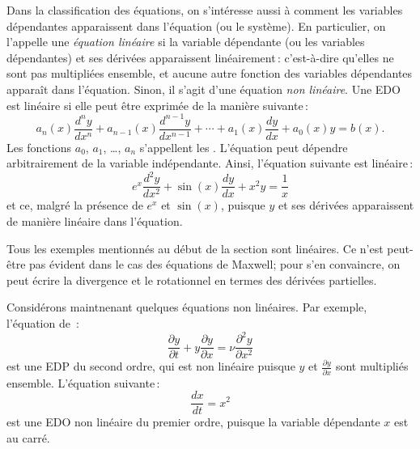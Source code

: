 \medskip

Dans la classification des \'equations, on s'int\'eresse aussi \`a comment les variables d\'ependantes apparaissent dans l'\'equation (ou le syst\`eme).  En particulier, on l'appelle une 
\emph{\'equation lin\'eaire} si la variable d\'ependante (ou les variables d\'ependantes) et ses d\'eriv\'ees apparaissent lin\'eairement\,:  c'est-\`a-dire qu'elles ne sont pas multipli\'ees ensemble, et aucune autre fonction des variables d\'ependantes appara\^it dans l'\'equation.  Sinon, il s'agit d'une \'equation 
\emph{non lin\'eaire}.  Une EDO est lin\'eaire si elle peut \^etre exprim\'ee de la mani\`ere suivante\,: 
\begin{equation} \label{classification:eqlingen}
a_n(x) \frac{d^n y}{dx^n} + 
a_{n-1}(x) \frac{d^{n-1} y}{dx^{n-1}} + 
\cdots
+
a_{1}(x) \frac{dy}{dx}
+
a_{0}(x) y = b(x) .
\end{equation}
Les fonctions $a_0$, $a_1$, \ldots, $a_n$ s'appellent les
\emph{}.
L'\'equation peut d\'ependre arbitrairement de la variable ind\'ependante.  Ainsi, l'\'equation suivante est lin\'eaire\,:
\begin{equation} \label{classification:eqlinex}
e^x \frac{d^2 y}{dx^2} + 
\sin(x) \frac{d y}{dx} + 
x^2 y
=
\frac{1}{x}
\end{equation}
et ce, malgr\'e la pr\'esence de $e^x$ et $\sin(x)$, puisque $y$ et ses d\'eriv\'ees apparaissent de mani\`ere lin\'eaire dans l'\'equation.

Tous les exemples mentionnés au début de la section sont lin\'eaires.  Ce n'est peut-\^etre pas \'evident dans le cas des \'equations de Maxwell; pour s'en convaincre, on peut \'ecrire la divergence et le rotationnel en termes des d\'eriv\'ees partielles. 

Consid\'erons maintnenant quelques \'equations non lin\'eaires.  Par exemple, l'\'equation de \,: 
\begin{equation*}
\frac{\partial y}{\partial t} + 
y \frac{\partial y}{\partial x} =
\nu \frac{\partial^2 y}{\partial x^2} 
\end{equation*}
est une EDP du second ordre, qui est non lin\'eaire puisque $y$ et $\frac{\partial y}{\partial x}$ sont multipli\'es ensemble.
L'\'equation suivante\,: 
\begin{equation} \label{classification:eqnonlinode}
\frac{dx}{dt} = x^2
\end{equation}
est une EDO non lin\'eaire du premier ordre, puisque la variable d\'ependante $x$ est au carr\'e.

